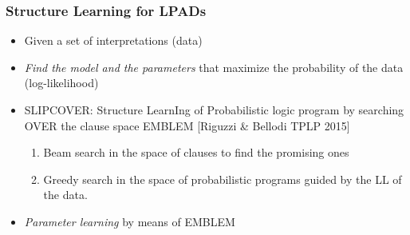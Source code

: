\documentclass[trans,aspectratio=1610]{beamer}
\begin{document}
\begin{frame}
\frametitle{Structure Learning for LPADs}
			\begin{itemize}
							\item Given
									a set of interpretations (data)
							\item \textit{Find the
							model and the parameters} that maximize the probability of the data (log-likelihood)

\item SLIPCOVER: Structure LearnIng of  Probabilistic logic program by searching OVER the clause space EMBLEM [Riguzzi \& Bellodi TPLP 2015]
\begin{enumerate}
											\item  Beam search in the space of clauses to find the promising ones
											\item  Greedy search in the space of probabilistic programs guided by the LL of the data.
										\end{enumerate}
											\item \textit{Parameter learning} by means of EMBLEM
							\end{itemize}
			\end{frame}
\end{document}
